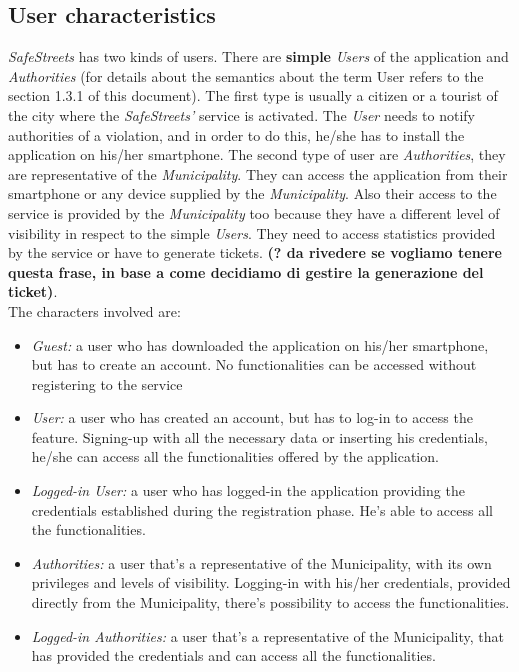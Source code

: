 \documentclass {article}
\begin{document}
	\subsection{User characteristics}
	{\it SafeStreets} has two kinds of users. There are  {\bf simple }{\it Users} of the application and {\it Authorities} (for details about the semantics about the term User refers to the section 1.3.1 of this document). The first type is usually a citizen or a tourist of the city where the {\it SafeStreets'} service is activated. The {\it User} needs to notify authorities of a violation,  and in order to do this, he/she has to install the application on his/her smartphone. The second type of user are {\it Authorities}, they are representative of the {\it Municipality}. They can access the application from their smartphone or any device supplied by the {\it Municipality}. Also their access to the service is provided by the {\it Municipality} too because they have a different level of visibility in respect to the simple {\it Users}. They need to access statistics provided by the service or have to generate tickets. {\bf (? da rivedere se vogliamo tenere questa frase, in base a come decidiamo di gestire la generazione del ticket)}. \\
	The characters involved are:
	\begin{itemize}
		\item {\it Guest:} a user who has downloaded the application on his/her smartphone, but has to create an account. No functionalities can be accessed without registering to the service
		\item {\it User:} a user who has created an account, but has to log-in to access the feature. Signing-up with all the necessary data or inserting his credentials, he/she can access all the functionalities offered by the application.
		\item {\it Logged-in User:} a user who has logged-in the application providing the credentials established during the registration phase. He's able to access all the functionalities. 
		\item {\it Authorities:} a user that's a representative of the Municipality, with its own privileges and levels of visibility. Logging-in with his/her credentials, provided directly from the Municipality, there's possibility to access the functionalities.
		\item {\it Logged-in Authorities:} a user that's a representative of the Municipality, that has provided the credentials and can access all the functionalities.
	\end{itemize}
	
\end{document}
